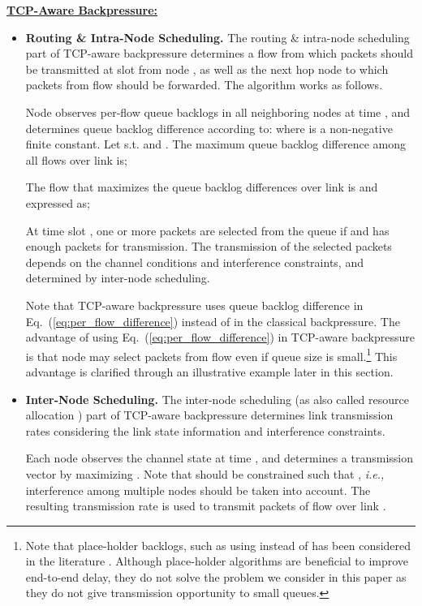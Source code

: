 \documentclass[conference]{IEEEtran}
\newcommand{\ie}{{\em i.e., }}
\begin{document}
\textbf{\underline{TCP-Aware Backpressure:}}
\begin{itemize}
\item \textbf{Routing \& Intra-Node Scheduling.} The routing \& intra-node scheduling part of TCP-aware backpressure determines a flow  from which packets should be transmitted at slot  from node , as well as the next hop node  to which packets from flow  should be forwarded. The algorithm works as follows.

  Node  observes per-flow queue backlogs in all neighboring nodes at time , and determines queue backlog difference according to:
   where  is a non-negative finite constant. Let  s.t.  and . The maximum queue backlog difference among all flows over link  is;
  
  The flow that maximizes the queue backlog differences over link  is  and expressed as;
  
  At time slot , one or more packets are selected from the queue  if    and  has enough packets for transmission. The transmission of the selected packets depends on the channel conditions and interference constraints, and determined by inter-node scheduling.

  Note that TCP-aware backpressure uses queue backlog difference  in Eq.~(\ref{eq:per_flow_difference}) instead of  in the classical backpressure. The advantage of using Eq.~(\ref{eq:per_flow_difference}) in TCP-aware backpressure is that node  may select packets from flow  even if queue size  is small.\footnote{\scriptsize Note that place-holder backlogs, such as using  instead of  has been considered in the literature \cite{neely_book}. Although place-holder algorithms are beneficial to improve end-to-end delay, they do not solve the problem we consider in this paper as they do not give transmission opportunity to small queues.} This advantage is clarified through an illustrative example later in this section.
\item \textbf{Inter-Node Scheduling.} The inter-node scheduling (as also called resource allocation \cite{neely_mod}) part of TCP-aware backpressure determines link transmission rates considering the link state information and interference constraints.

  Each node  observes the channel state  at time , and determines a transmission vector   by maximizing . Note that  should be constrained such that , \ie interference among multiple nodes should be taken into account. The resulting transmission rate  is used to transmit packets of flow  over link .
\end{itemize}
\end{document}

